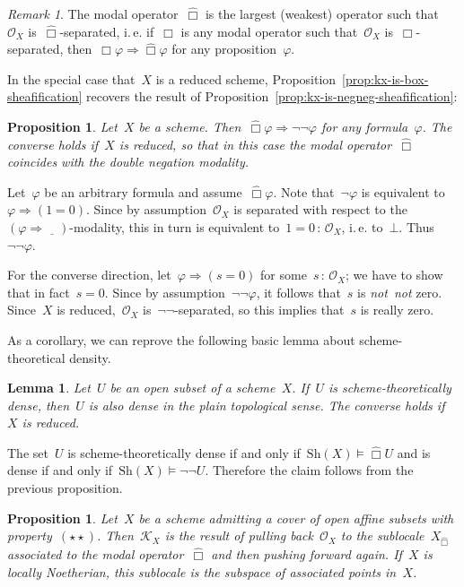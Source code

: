 \documentclass[10pt,reqno,a4paper]{amsbook}
\makeatletter
\theoremstyle{definition}
\theoremstyle{plain}
\newtheorem{prop}[defn]{Proposition}
\newtheorem{lemma}[defn]{Lemma}
\theoremstyle{remark}
\newtheorem{rem}[defn]{Remark}
\renewcommand{\O}{\mathcal{O}}
\newcommand{\K}{\mathcal{K}}
\newcommand{\placeholder}{\underline{\quad}}
\newcommand{\Sh}{\mathrm{Sh}}
\newcommand{\?}{\,{:}\,}
\renewcommand{\_}{\mathpunct{.}\,}
\newcommand{\sdense}{{\widehat\Box}}
\newcommand{\sdenseother}{\Box}
\newcommand{\ie}{i.\,e.\@\xspace}
\newcommand{\notnot}{\emph{not~not}\xspace}
\renewenvironment{proof}[1][\proofname]{\par
  \pushQED{\qed}%
  \normalfont \topsep6\p@\@plus6\p@\relax
  \trivlist
  \item[\hskip\labelsep
        \itshape
    #1\@addpunct{.}]\ignorespaces
}{%
  \popQED\endtrivlist\@endpefalse
}
\makeatother
\begin{document}
\begin{rem}The modal operator~$\sdense$ is the largest (weakest) operator such
that~$\O_X$ is~$\sdense$-separated, \ie if~$\sdenseother$ is any modal operator
such that~$\O_X$ is~$\sdenseother$-separated, then~$\sdenseother\varphi
\Rightarrow \sdense\varphi$ for any proposition~$\varphi$.\end{rem}

In the special case that~$X$ is a reduced scheme,
Proposition~\ref{prop:kx-is-box-sheafification} recovers
the result of Proposition~\ref{prop:kx-is-negneg-sheafification}:

\begin{prop}Let~$X$ be a scheme. Then~$\sdense\varphi \Rightarrow \neg\neg\varphi$
for any formula~$\varphi$. The converse holds if~$X$ is reduced, so that in
this case the modal operator~$\sdense$ coincides with the double negation modality.\end{prop}
\begin{proof}Let~$\varphi$ be an arbitrary formula and assume~$\sdense\varphi$. Note that~$\neg\varphi$ is
equivalent to~$\varphi \Rightarrow (1 =
0)$. Since by assumption~$\O_X$ is separated with respect to the~$(\varphi
\Rightarrow \placeholder)$-modality, this in turn is equivalent to~$1 = 0 \?
\O_X$, \ie to~$\bot$. Thus~$\neg\neg\varphi$.

For the converse direction, let~$\varphi \Rightarrow (s = 0)$ for some~$s\?\O_X$;
we have to show that in fact~$s = 0$. Since by assumption~$\neg\neg\varphi$, it
follows that~$s$ is \notnot zero. Since~$X$ is reduced,~$\O_X$
is~$\neg\neg$-separated, so this implies that~$s$ is really zero.
\end{proof}

As a corollary, we can reprove the following basic lemma about
scheme-theoretical density.
\begin{lemma}Let~$U$ be an open subset of a scheme~$X$. If~$U$ is
scheme-theoretically dense, then~$U$ is also dense in the plain topological
sense. The converse holds if~$X$ is reduced.\end{lemma}
\begin{proof}The set~$U$ is scheme-theoretically dense if and only if~$\Sh(X)
\models \sdense U$ and is dense if and only if~$\Sh(X) \models \neg\neg U$.
Therefore the claim follows from the previous proposition.
\end{proof}

\begin{prop}\label{prop:kx-ass}
Let~$X$ be a scheme admitting a cover of open affine subsets with
property~$(\star\star)$. Then~$\K_X$ is the result of
pulling back~$\O_X$ to the sublocale~$X_\sdense$ associated to the modal
operator~$\sdense$ and then pushing forward again. If~$X$ is locally Noetherian,
this sublocale is the subspace of associated points in~$X$.
\end{prop}
\end{document}
